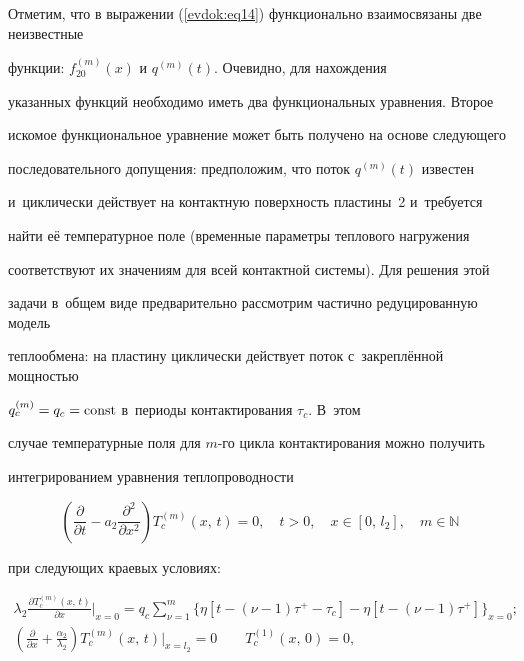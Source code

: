 Отметим, что в выражении (\ref{evdok:eq14}) функционально взаимосвязаны две неизвестные 

функции: $f_{20}^{(m)} (x)$ и $q^{(m)} (t)$. Очевидно, для нахождения 

указанных функций необходимо иметь два функциональных уравнения. Второе 

искомое функциональное уравнение может быть получено на основе следующего 

последовательного допущения: предположим, что поток $q^{(m)} (t)$ известен 

и~циклически действует на контактную поверхность пластины~2 и~требуется 

найти её температурное поле (временные параметры теплового нагружения 

соответствуют их значениям для всей контактной системы). Для решения этой 

задачи в~общем виде предварительно рассмотрим частично редуцированную модель 

теплообмена: на пластину циклически действует поток с~закреплённой мощностью 

$q_c^{(m)} = q_c = \rm const$ в~периоды контактирования $\tau _{c}$. В~этом 

случае температурные поля для $m$-го цикла контактирования можно получить 

интегрированием уравнения теплопроводности 

\begin{equation}

\label{evdok:eq15}

\left( {\frac{\partial }{\partial t} - a_2 \frac{\partial ^2}{\partial x^2}} 

\right)T_c^{(m)} (x,\,t) = 0,\quad t > 0, \quad x \in [0,\, l_2 ],\quad m \in \mathbb N

\end{equation}

при следующих краевых условиях:

\begin{gather}

\label{evdok:eq16}

\lambda _2 \frac{\partial T_c^{(m)} (x,\,t)}{\partial x}\Big|_{x=0} = 

q_c \sum\limits_{\nu = 1}^m \Big\{ \eta \left[ t-\left(\nu - 1\right)\tau^+ - \tau _c\right] - 

\eta \left[ t - (\nu - 1)\tau ^ + \right] \Big\}_{x=0};

\\

\label{evdok:eq17}

\left( {\frac{\partial }{\partial x} + \frac{\alpha _2 }{\lambda _2 }} 

\right)T_c^{(m)} (x,\,t)\Big|_{x=l_2}  = 0

\qquad

T_c^{(1)} (x,\,0) = 0,

\end{gather}

